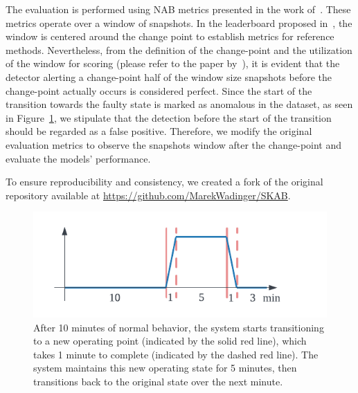 The evaluation is performed using NAB metrics presented in the work of~\citet{Ahmad2017}. These metrics operate over a window of snapshots. In the leaderboard proposed in~\citet{Katser2020}, the window is centered around the change point to establish metrics for reference methods. Nevertheless, from the definition of the change-point and the utilization of the window for scoring (please refer to the paper by~\citet{Lavin2015}), it is evident that the detector alerting a change-point half of the window size snapshots before the change-point actually occurs is considered perfect. Since the start of the transition towards the faulty state is marked as anomalous in the dataset, as seen in Figure~\ref{fig:scab_interpretation}, we stipulate that the detection before the start of the transition should be regarded as a false positive. Therefore, we modify the original evaluation metrics to observe the snapshots window after the change-point and evaluate the models' performance.

To ensure reproducibility and consistency, we created a fork of the original repository available at \url{https://github.com/MarekWadinger/SKAB}.

\begin{figure}[H]
	\centering
	\includegraphics[width=\linewidth]{figures/scab-interpretation.pdf}
	\caption{After 10 minutes of normal behavior, the system starts transitioning to a new operating point (indicated by the solid red line), which takes 1 minute to complete (indicated by the dashed red line). The system maintains this new operating state for 5 minutes, then transitions back to the original state over the next minute.}\label{fig:scab_interpretation}
\end{figure}

